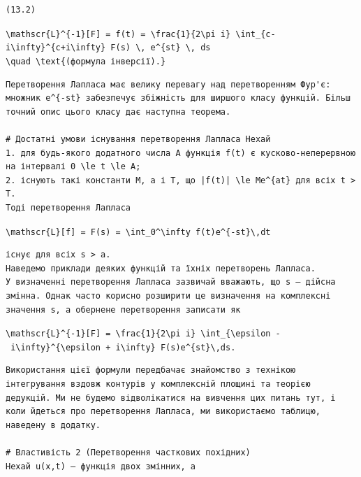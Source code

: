 \documentclass[
  ukrainian,
]{article}
\begin{document}
\begin{verbatim}
(13.2)
\end{verbatim}

\texttt{\textbackslash{}mathscr\{L\}\^{}\{-1\}{[}F{]}\ =\ f(t)\ =\ \textbackslash{}frac\{1\}\{2\textbackslash{}pi\ i\}\ \textbackslash{}int\_\{c-i\textbackslash{}infty\}\^{}\{c+i\textbackslash{}infty\}\ F(s)\ \textbackslash{},\ e\^{}\{st\}\ \textbackslash{},\ ds}
\texttt{\textbackslash{}quad\ \textbackslash{}text\{(формула\ інверсії).\}}

\begin{verbatim}
Перетворення Лапласа має велику перевагу над перетворенням Фур'є: множник e^{-st} забезпечує збіжність для ширшого класу функцій. Більш точний опис цього класу дає наступна теорема.

# Достатні умови існування перетворення Лапласа Нехай
1. для будь-якого додатного числа A функція f(t) є кусково-неперервною на інтервалі 0 \le t \le A;
2. існують такі константи M, a і T, що |f(t)| \le Me^{at} для всіх t > T.
Тоді перетворення Лапласа
\end{verbatim}

\texttt{\textbackslash{}mathscr\{L\}{[}f{]}\ =\ F(s)\ =\ \textbackslash{}int\_0\^{}\textbackslash{}infty\ f(t)e\^{}\{-st\}\textbackslash{},dt}

\begin{verbatim}
існує для всіх s > a.
Наведемо приклади деяких функцій та їхніх перетворень Лапласа.
У визначенні перетворення Лапласа зазвичай вважають, що s — дійсна змінна. Однак часто корисно розширити це визначення на комплексні значення s, а обернене перетворення записати як
\end{verbatim}

\texttt{\textbackslash{}mathscr\{L\}\^{}\{-1\}{[}F{]}\ =\ \textbackslash{}frac\{1\}\{2\textbackslash{}pi\ i\}\ \textbackslash{}int\_\{\textbackslash{}epsilon\ -\ i\textbackslash{}infty\}\^{}\{\textbackslash{}epsilon\ +\ i\textbackslash{}infty\}\ F(s)e\^{}\{st\}\textbackslash{},ds.}

\begin{verbatim}
Використання цієї формули передбачає знайомство з технікою інтегрування вздовж контурів у комплексній площині та теорією дедукцій. Ми не будемо відволікатися на вивчення цих питань тут, і коли йдеться про перетворення Лапласа, ми використаємо таблицю, наведену в додатку.

# Властивість 2 (Перетворення часткових похідних)
Нехай u(x,t) — функція двох змінних, а
\end{verbatim}
\end{document}
